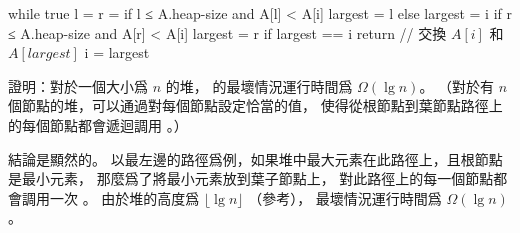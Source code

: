 \startANSWER
{}
\startCLRSCODE
while true
	l = 
	r = 
	if l ≤ A.heap-size and A[l] < A[i]
		largest = l
	else
		largest = i
	if r ≤ A.heap-size and A[r] < A[i]
		largest = r
	if largest == i
		return
	// 交換 $A[i]$ 和 $A[largest]$
	i = largest
\stopCLRSCODE
\stopANSWER

\blank

\startEXERCISE
證明：對於一個大小爲 $n$ 的堆，  的最壞情況運行時間爲 $\Omega(\lg{n})$。
（\hint 對於有 $n$ 個節點的堆，可以通過對每個節點設定恰當的值，
使得從根節點到葉節點路徑上的每個節點都會遞迴調用 。）
\stopEXERCISE

\startANSWER
結論是顯然的。
以最左邊的路徑爲例，如果堆中最大元素在此路徑上，且根節點是最小元素，
那麼爲了將最小元素放到葉子節點上，
對此路徑上的每一個節點都會調用一次 。
由於堆的高度爲 $\lfloor \lg{n} \rfloor$ （參考），
最壞情況運行時間爲 $\Omega(\lg{n})$。
\stopANSWER

\stopsection
